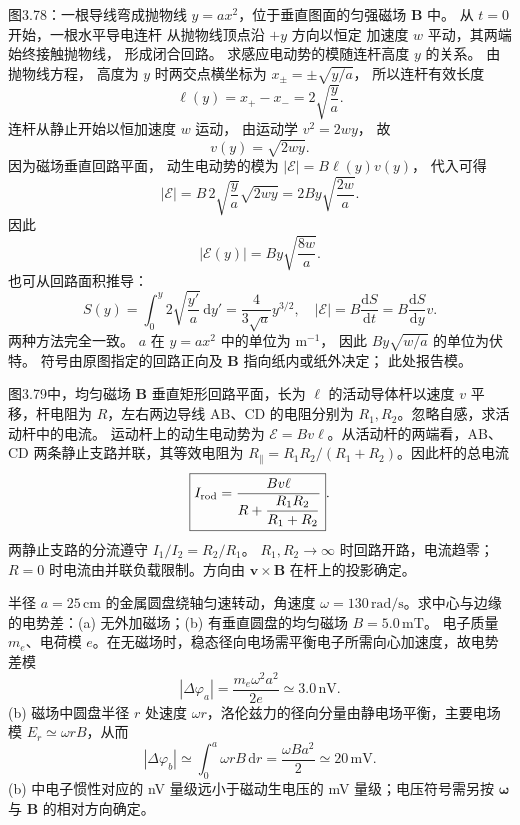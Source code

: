 
图3.78：一根导线弯成抛物线
$y=ax^2$，位于垂直图面的匀强磁场
$\bm B$ 中。
从 $t=0$ 开始，一根水平导电连杆
从抛物线顶点沿 $+y$ 方向以恒定
加速度 $w$ 平动，其两端始终接触抛物线，
形成闭合回路。
求感应电动势的模随连杆高度 $y$ 的关系。
\exsolution
由抛物线方程，
高度为 $y$ 时两交点横坐标为
$x_\pm=\pm\sqrt{y/a}$，
所以连杆有效长度
\[
\ell(y)=x_+-x_-=2\sqrt{\frac ya}.
\]
连杆从静止开始以恒加速度 $w$ 运动，
由运动学
$v^2=2wy$，
故
\[
v(y)=\sqrt{2wy}.
\]
因为磁场垂直回路平面，
动生电动势的模为
$|\mathcal E|=B\ell(y)v(y)$，
代入可得
\[
|\mathcal E|=
B\,2\sqrt{\frac ya}\sqrt{2wy}
=2By\sqrt{\frac{2w}{a}}.
\]
因此
\[
\boxed{|\mathcal E(y)|=
By\sqrt{\frac{8w}{a}}}.
\]
也可从回路面积推导：
\[
S(y)=\int_0^y
2\sqrt{\frac{y'}a}\,\mathrm dy'
=\frac4{3\sqrt a}y^{3/2},
\quad
|\mathcal E|=B\frac{\mathrm dS}{\mathrm dt}
=B\frac{\mathrm dS}{\mathrm dy}v.
\]
两种方法完全一致。
\excheck $a$ 在 $y=ax^2$ 中的单位为
$\mathrm{m^{-1}}$，
因此
$By\sqrt{w/a}$ 的单位为伏特。
符号由原图指定的回路正向及
$\bm B$ 指向纸内或纸外决定；
此处报告模。

图3.79中，均匀磁场 $\bm B$ 垂直矩形回路平面，长为 $\ell$ 的活动导体杆以速度 $v$ 平移，杆电阻为 $R$，左右两边导线 AB、CD 的电阻分别为 $R_1,R_2$。忽略自感，求活动杆中的电流。
\exsolution
运动杆上的动生电动势为 $\mathcal E=Bv\ell$。从活动杆的两端看，AB、CD 两条静止支路并联，其等效电阻为 $R_\parallel=R_1R_2/(R_1+R_2)$。因此杆的总电流
\[
\boxed{I_{\rm rod}=\frac{Bv\ell}{R+\dfrac{R_1R_2}{R_1+R_2}}}.
\]
两静止支路的分流遵守 $I_1/I_2=R_2/R_1$。
\excheck $R_1,R_2\to\infty$ 时回路开路，电流趋零；$R=0$ 时电流由并联负载限制。方向由 $\bm v\times\bm B$ 在杆上的投影确定。

半径 $a=25\,\mathrm{cm}$ 的金属圆盘绕轴匀速转动，角速度 $\omega=130\,\mathrm{rad/s}$。求中心与边缘的电势差：(a) 无外加磁场；(b) 有垂直圆盘的均匀磁场 $B=5.0\,\mathrm{mT}$。
\exsolution
电子质量 $m_e$、电荷模 $e$。在无磁场时，稳态径向电场需平衡电子所需向心加速度，故电势差模
\[
\boxed{|\Delta\varphi_a|=\frac{m_e\omega^2a^2}{2e}
\simeq3.0\,\mathrm{nV}}.
\]
(b) 磁场中圆盘半径 $r$ 处速度 $\omega r$，洛伦兹力的径向分量由静电场平衡，主要电场模 $E_r\simeq\omega rB$，从而
\[
\boxed{|\Delta\varphi_b|\simeq
\int_0^a\omega rB\,\mathrm dr
=\frac{\omega Ba^2}{2}\simeq20\,\mathrm{mV}}.
\]
\excheck (b) 中电子惯性对应的 nV 量级远小于磁动生电压的 mV 量级；电压符号需另按 $\bm\omega$ 与 $\bm B$ 的相对方向确定。

